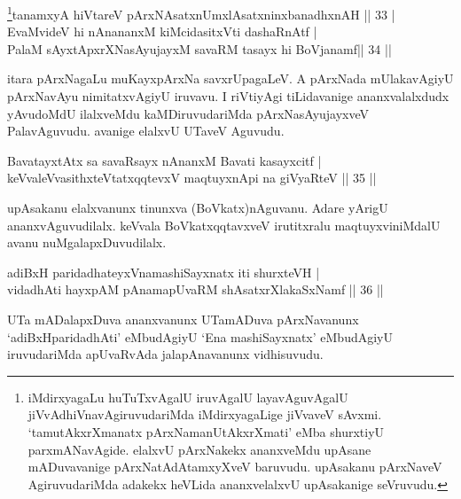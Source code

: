 
\begin{shl}
\footnote{iMdirxyagaLu huTuTxvAgalU iruvAgalU layavAguvAgalU 
jiVvAdhiVnavAgiruvudariMda iMdirxyagaLige jiVvaveV sAvxmi. 
`tamutAkxrXmanatx pArxNamanUtAkxrXmati' eMba shurxtiyU parxmANavAgide. 
elalxvU pArxNakekx ananxveMdu upAsane mADuvavanige pArxNatAdAtamxyXveV 
baruvudu. upAsakanu pArxNaveV AgiruvudariMda adakekx heVLida 
ananxvelalxvU upAsakanige seVruvudu.}tanamxyA hiVtareV pArxNAsatxnUmxlAsatxninxbanadhxnAH \hfill|| 33 | \\
EvaMvideV hi nAnananxM kiMcidasitxVti dashaRnAtf | \\
PalaM sAyxtApxrXNasAyujayxM savaRM tasayx hi BoVjanamf\hfill|| 34 || 
\end{shl}

\begin{artha}
itara pArxNagaLu muKayxpArxNa savxrUpagaLeV. A pArxNada mUlakavAgiyU pArxNavAyu nimitatxvAgiyU iruvavu. I riVtiyAgi tiLidavanige ananxvalalxdudx yAvudoMdU ilalxveMdu kaMDiruvudariMda pArxNasAyujayxveV PalavAguvudu. avanige elalxvU UTaveV Aguvudu.
\end{artha}


\begin{shl}
BavatayxtAtx sa savaRsayx nAnanxM Bavati kasayxcitf | \\
keVvaleV\s vasithxteV\s tatxqqtevxV maqtuyxnA\s pi na giVyaRteV \hfill|| 35 || 
\end{shl}

\begin{artha}
upAsakanu elalxvanunx tinunxva (BoVkatx)nAguvanu. Adare yArigU ananxvAguvudilalx. keVvala BoVkatxqqtavxveV irutitxralu maqtuyxviniMdalU avanu nuMgalapxDuvudilalx.
\end{artha}


\begin{shl}
adiBxH paridadhateyxVnamashiSayxnatx iti shurxteVH | \\
vidadhAti hayxpAM pAnamapUvaRM shAsatxrXlakaSxNamf \hfill|| 36 || 
\end{shl}

\begin{artha}
UTa mADalapxDuva ananxvanunx UTamADuva pArxNavanunx `adiBxHparidadhAti' eMbudAgiyU `Ena mashiSayxnatx' eMbudAgiyU iruvudariMda apUvaRvAda jalapAnavanunx vidhisuvudu.
\end{artha}

